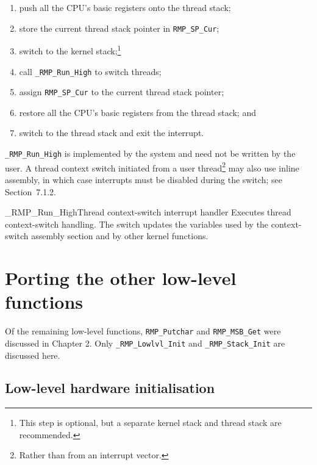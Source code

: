 \begin{enumerate}
    \item push all the CPU's basic registers onto the thread stack;
    \item store the current thread stack pointer in \texttt{RMP\_SP\_Cur};
    \item switch to the kernel stack;\footnote{This step is optional, but a separate kernel stack and thread stack are recommended.}
    \item call \texttt{\_RMP\_Run\_High} to switch threads;
    \item assign \texttt{RMP\_SP\_Cur} to the current thread stack pointer;
    \item restore all the CPU's basic registers from the thread stack; and
    \item switch to the thread stack and exit the interrupt.
\end{enumerate}

\texttt{\_RMP\_Run\_High} is implemented by the system and need not be written
by the user.
A thread context switch initiated from a user thread\footnote{Rather than from an interrupt vector.} may also use inline assembly, in which case interrupts must be disabled during the switch; see Section~7.1.2.

\begin{apidesc}{\_RMP\_Run\_High}{Thread context-switch interrupt handler}\label{api:_RMP_Run_High}
    Executes thread context-switch handling. The switch updates the variables used by the context-switch assembly section and by other kernel functions.
    \begin{apiparams}
    \end{apiparams}
    \begin{apiret}
    \end{apiret}
\end{apidesc}

\section{Porting the other low-level functions}

Of the remaining low-level functions, \texttt{RMP\_Putchar} and \texttt{RMP\_MSB\_Get} were discussed in Chapter 2.
Only \texttt{\_RMP\_Lowlvl\_Init} and \texttt{\_RMP\_Stack\_Init} are discussed here.

\subsection{Low-level hardware initialisation}

